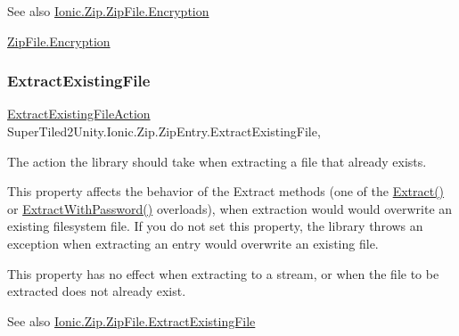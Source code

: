 \begin{DoxySeeAlso}{See also}
\mbox{\hyperlink{class_super_tiled2_unity_1_1_ionic_1_1_zip_1_1_zip_file_aeaa88018eaea63cd09f9e05a853c51f8}{Ionic.\+Zip.\+Zip\+File.\+Encryption}}


\end{DoxySeeAlso}
\mbox{\hyperlink{class_super_tiled2_unity_1_1_ionic_1_1_zip_1_1_zip_file_aeaa88018eaea63cd09f9e05a853c51f8}{Zip\+File.\+Encryption}}\mbox{\label{class_super_tiled2_unity_1_1_ionic_1_1_zip_1_1_zip_entry_ad1ab903c29b91edb82e7c6a9768552dd}} 
\subsubsection{\texorpdfstring{Extract\+Existing\+File}{ExtractExistingFile}}
{\footnotesize\ttfamily \mbox{\hyperlink{namespace_super_tiled2_unity_1_1_ionic_1_1_zip_a3f8db7242d746d36b45114257b4fe4c0}{Extract\+Existing\+File\+Action}} Super\+Tiled2\+Unity.\+Ionic.\+Zip.\+Zip\+Entry.\+Extract\+Existing\+File\hspace{0.3cm}{\ttfamily [get]}, {\ttfamily [set]}}



The action the library should take when extracting a file that already exists. 

This property affects the behavior of the Extract methods (one of the {\ttfamily \mbox{\hyperlink{class_super_tiled2_unity_1_1_ionic_1_1_zip_1_1_zip_entry_a9d65543aadd23e47e188175412891b42}{Extract()}}} or {\ttfamily \mbox{\hyperlink{class_super_tiled2_unity_1_1_ionic_1_1_zip_1_1_zip_entry_a346d1d4eaf4ccb1274fe31629f3cb429}{Extract\+With\+Password()}}} overloads), when extraction would would overwrite an existing filesystem file. If you do not set this property, the library throws an exception when extracting an entry would overwrite an existing file. 

This property has no effect when extracting to a stream, or when the file to be extracted does not already exist. 

\begin{DoxySeeAlso}{See also}
\mbox{\hyperlink{class_super_tiled2_unity_1_1_ionic_1_1_zip_1_1_zip_file_ab900ee0fb15ee35c3c76ef492ff2517f}{Ionic.\+Zip.\+Zip\+File.\+Extract\+Existing\+File}}


\end{DoxySeeAlso}


